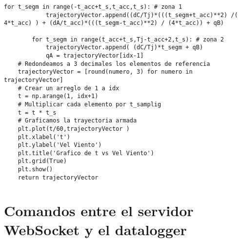\begin{lstlisting}[style=pythonstyle, caption={Algoritmo generador de referencias para el controlador PID.}, label=cdg:genTrayectoria, basicstyle=\ttfamily\fontsize{8}{8}\selectfont]
        for t_segm in range(-t_acc+t_s,t_acc,t_s): # zona 1  
            trajectoryVector.append((dC/Tj)*(((t_segm+t_acc)**2) /( 4*t_acc) ) + (dA/t_acc)*(((t_segm-t_acc)**2) / (4*t_acc)) + qB)  
            
        for t_segm in range(t_acc+t_s,Tj-t_acc+2,t_s): # zona 2
            trajectoryVector.append( (dC/Tj)*t_segm + qB)
            qA = trajectoryVector[idx-1]
    # Redondeamos a 3 decimales los elementos de referencia
    trajectoryVector = [round(numero, 3) for numero in trajectoryVector]
    # Crear un arreglo de 1 a idx
    t = np.arange(1, idx+1)
    # Multiplicar cada elemento por t_samplig
    t = t * t_s
    # Graficamos la trayectoria armada
    plt.plot(t/60,trajectoryVector )
    plt.xlabel('t')
    plt.ylabel('Vel Viento')
    plt.title('Grafico de t vs Vel Viento')
    plt.grid(True)
    plt.show()
    return trajectoryVector
\end{lstlisting}
\newpage
\section{Comandos entre el servidor WebSocket y el datalogger}

